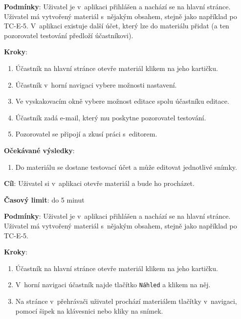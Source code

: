 \textbf{Podmínky}:  Uživatel je v~aplikaci přihlášen a nachází se na hlavní stránce.  Uživatel má vytvořený materiál s~nějakým obsahem, stejně jako například po TC-E-5. V~aplikaci existuje další účet, který lze do materiálu přidat (a ten pozorovatel testování předloží účastníkovi).

\textbf{Kroky}:

\begin{enumerate}[leftmargin=1.4cm]
    \item Účastník na hlavní stránce otevře materiál klikem na jeho kartičku.
    \item Účastník v~horní navigaci vybere možnosti nastavení.
    \item Ve vyskakovacím okně vybere možnost editace spolu účastníku editace.
    \item Účastník zadá e-mail, který mu poskytne pozorovatel testování.
    \item Pozorovatel se připojí a zkusí práci s~editorem.
\end{enumerate}

\textbf{Očekávané výsledky}:

\begin{enumerate}[leftmargin=1.4cm]
    \item Do materiálu se dostane testovací účet a může editovat jednotlivé snímky.
\end{enumerate}






\vspace{1em}

\textbf{Cíl}: Uživatel si v~aplikaci otevře materiál a bude ho procházet.

\textbf{Časový limit}: do 5 minut

\textbf{Podmínky}:  Uživatel je v~aplikaci přihlášen a nachází se na hlavní stránce.  Uživatel má vytvořený materiál s~nějakým obsahem, stejně jako například po TC-E-5.

\textbf{Kroky}:

\begin{enumerate}[leftmargin=1.4cm]
    \item Účastník na hlavní stránce otevře materiál klikem na jeho kartičku.
    \item V~horní navigaci účastník najde tlačítko \verb|Náhled| a klikem na něj.
    \item Na stránce v~přehrávači uživatel prochází materiálem tlačítky v~navigaci, pomocí šipek na klávesnici nebo kliky na snímek.
\end{enumerate}

